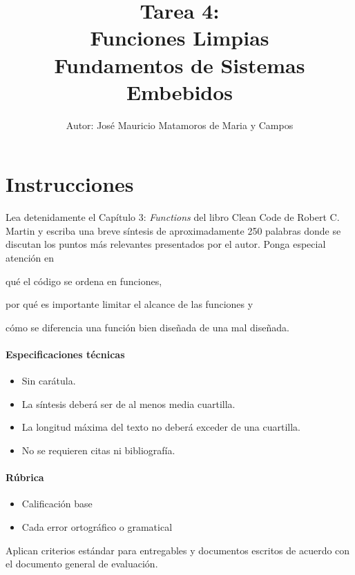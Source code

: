 \documentclass[letterpaper,10.5pt]{article}
\title{Tarea 4:\\Funciones Limpias\\
{\large Fundamentos de Sistemas Embebidos}}
\author{\footnotesize Autor: José Mauricio Matamoros de Maria y Campos}
\date{}
\begin{document}
\maketitle
\thispagestyle{empty}


\section{Instrucciones}%
\label{sec:instructions}
Lea detenidamente el Capítulo 3: \emph{Functions} del libro Clean Code de Robert C. Martin y escriba una breve síntesis de aproximadamente 250 palabras donde se discutan los puntos más relevantes presentados por el autor.
Ponga especial atención en
\begin{enumerate*}[label=\roman*\rpar]
	\item qué el código se ordena en funciones,
	\item por qué es importante limitar el alcance de las funciones
	y
	\item cómo se diferencia una función bien diseñada de una mal diseñada.
\end{enumerate*}

\paragraph{Especificaciones técnicas}
\begin{itemize}
	\item Sin carátula.
	\item La síntesis deberá ser de al menos media cuartilla.
	\item La longitud máxima del texto no deberá exceder de una cuartilla.
	\item No se requieren citas ni bibliografía.
\end{itemize}

\paragraph{Rúbrica}
\begin{itemize}
	\item {} Calificación base
	\item {} Cada error ortográfico o gramatical
\end{itemize}
Aplican criterios estándar para entregables y documentos escritos de acuerdo con el documento general de evaluación.
\end{document}

